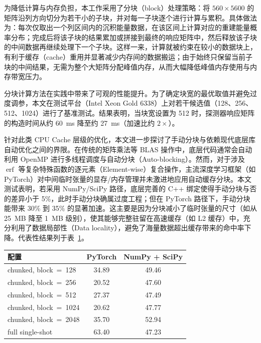 为降低计算与内存负担，本工作采用了分块（block）处理策略：将 $560\times5600$ 的矩阵沿列方向切分为若干小的子块\cite{Lam1991}，并对每一子块逐个进行计算与累积。具体做法为：每次仅取出一个列区间内的沉积能量数据，在该区间上计算对应的重建能量概率分布；完成后将该子块的结果累加或拼接到最终的响应矩阵中，然后释放该子块的中间数据再继续处理下一个子块。这样一来，计算就被约束在较小的数据块上，有利于缓存（cache）重用并显著减少内存间的数据搬运；由于始终只保留当前子块的中间结果，无需为整个大矩阵分配峰值内存，从而大幅降低峰值内存使用与内存带宽压力。


分块计算方法在实践中带来了可观的性能提升。为了确定块宽的最优取值并避免过度调参，本文在测试平台（Intel Xeon Gold 6338）上对若干候选值（128、256、512、1024）进行了基准测试。结果表明，当块宽设置为 512 时，探测器响应矩阵的构造时间从约 60~ms 降至约 27~ms（加速比约 $2\times$）。

针对此类 CPU Cache 层级的优化，本文进一步探讨了手动分块与依赖现代底层库自动优化之间的界限。在传统的矩阵乘法等 BLAS 操作中，底层代码通常会自动利用 OpenMP 进行多线程调度与自动分块（Auto-blocking）。然而，对于涉及 $\operatorname{erf}$ 等复杂特殊函数的逐元素（Element-wise）复合操作，主流深度学习框架（如 PyTorch）对中间临时张量的显存/内存管理并未激进地应用自动缓存分块。本文测试表明，若采用 NumPy/SciPy 路径，底层完善的 C++ 绑定使得手动分块与否的差异小于 5\%，此时手动分块确属过度工程；但在 PyTorch 路径下，手动分块能带来 30\% 到 35\% 的显著加速。这主要是因为分块减小了临时张量的尺寸（如从 25~MB 降至 1~MB 级别），使其能够完整驻留在高速缓存（如 L2 缓存）中，充分利用了数据局部性（Data locality），避免了海量数据超出缓存带来的命中率下降。代表性结果列于表~\ref{tab:block_backend_compare}。

\begin{table}[htbp]
\centering
{}
\label{tab:block_backend_compare}
\begin{tabular}{lcc}
\toprule
配置 & PyTorch & NumPy + SciPy \\
\midrule
chunked, block~=~128  & 34.89 & 49.46 \\
chunked, block~=~256  & 20.52 & 47.60 \\
chunked, block~=~512  & 27.37 & 47.49 \\
chunked, block~=~1024 & 20.62 & 47.77 \\
chunked, block~=~2048 & 35.70 & 52.94 \\
full single-shot      & 63.40 & 47.23 \\
\bottomrule
\end{tabular}
\end{table}

